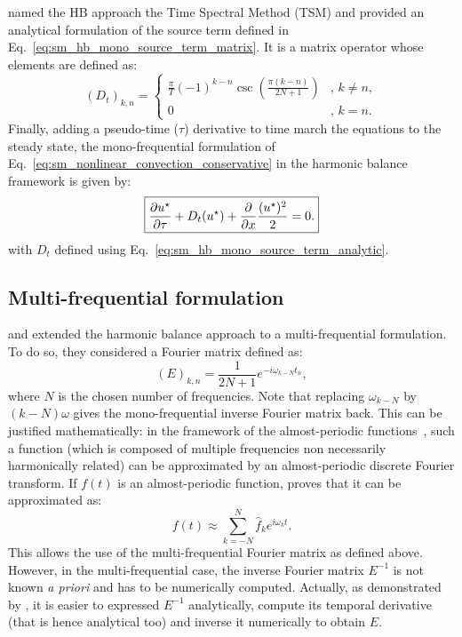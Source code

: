 \citet{Gopinath2005} named the HB approach the 
Time Spectral Method (TSM) and provided 
an analytical formulation of the
source term defined in Eq.~\eqref{eq:sm_hb_mono_source_term_matrix}.
It is a matrix operator whose elements are defined as:
\begin{equation}
  (D_t)_{k, n} =
  \begin{cases}
    \frac{\pi}{T}(-1)^{k-n}\csc\left(\frac{\pi
        (k-n)}{2N+1}\right) &, \, k\neq n,\\
    0 &, \, k=n.
  \end{cases}
  \label{eq:sm_hb_mono_source_term_analytic}
\end{equation}
Finally, adding a pseudo-time ($\tau$) derivative to 
time march the equations to the steady state, 
the mono-frequential formulation of 
Eq.~\eqref{eq:sm_nonlinear_convection_conservative} in the harmonic
balance framework is given by:
\begin{equation}
	\fbox{$
	\displaystyle \frac{\partial u^\star}{\partial \tau} + 
	D_t (u^\star) + 
	\displaystyle \frac{\partial}{\partial x}
		\frac{(u^\star)^2}{2} = 0.
	$}
\end{equation}
with $D_t$ defined using Eq.~\eqref{eq:sm_hb_mono_source_term_analytic}.

\subsection{Multi-frequential formulation}
\citet{Gopinath2007} and \citet{Ekici2007} 
extended the harmonic balance approach to
a multi-frequential formulation. To do so, they considered
a Fourier matrix defined as:
\begin{equation}
	(E)_{k,n} = \frac{1}{2N+1} e^{-i \omega_{k-N} t_n},
\end{equation}
where $N$ is the chosen number of frequencies.
Note that replacing $\omega_{k-N}$ by $(k - N) \omega$ gives
the mono-frequential inverse Fourier matrix back. 
This can be justified mathematically: in the
framework of the almost-periodic functions~\cite{Besicovitch1932},
such a function (which is composed of multiple
frequencies non necessarily harmonically related) can be approximated
by an almost-periodic
discrete Fourier transform. If $f(t)$ is an almost-periodic function,
\citet{Besicovitch1932} proves that it can be approximated as:
\begin{equation}
	f(t) \approx \sum_{k=-N}^{N} \widehat{f}_k 
	e^{i \omega_k t}.
\end{equation}
This allows the use of the multi-frequential Fourier matrix as defined
above. However, in the multi-frequential case, the inverse Fourier matrix
$E^{-1}$ is not known \textit{a priori} 
and has to be numerically computed. Actually, as demonstrated by 
\citet{Gopinath2007}, it is easier to expressed $E^{-1}$ analytically,
compute its temporal derivative (that is hence analytical too) 
and inverse it numerically to obtain $E$.

